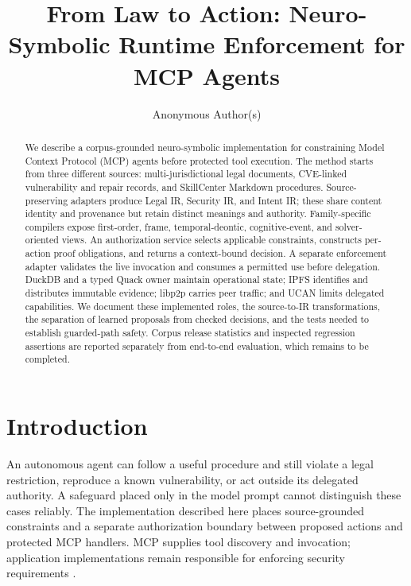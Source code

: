 \documentclass{article}
\title{From Law to Action: Neuro-Symbolic Runtime Enforcement for MCP Agents}
\author{Anonymous Author(s)}
\begin{document}
\maketitle
\begin{abstract}
We describe a corpus-grounded neuro-symbolic implementation for constraining Model Context Protocol (MCP) agents before protected tool execution. The method starts from three different sources: multi-jurisdictional legal documents, CVE-linked vulnerability and repair records, and SkillCenter Markdown procedures. Source-preserving adapters produce Legal IR, Security IR, and Intent IR; these share content identity and provenance but retain distinct meanings and authority. Family-specific compilers expose first-order, frame, temporal-deontic, cognitive-event, and solver-oriented views. An authorization service selects applicable constraints, constructs per-action proof obligations, and returns a context-bound decision. A separate enforcement adapter validates the live invocation and consumes a permitted use before delegation. DuckDB and a typed Quack owner maintain operational state; IPFS identifies and distributes immutable evidence; libp2p carries peer traffic; and UCAN limits delegated capabilities. We document these implemented roles, the source-to-IR transformations, the separation of learned proposals from checked decisions, and the tests needed to establish guarded-path safety. Corpus release statistics and inspected regression assertions are reported separately from end-to-end evaluation, which remains to be completed.
\end{abstract}

\section{Introduction}

An autonomous agent can follow a useful procedure and still violate a legal restriction, reproduce a known vulnerability, or act outside its delegated authority. A safeguard placed only in the model prompt cannot distinguish these cases reliably. The implementation described here places source-grounded constraints and a separate authorization boundary between proposed actions and protected MCP handlers. MCP supplies tool discovery and invocation; application implementations remain responsible for enforcing security requirements \citep{mcp,mcp-auth}.
\end{document}
